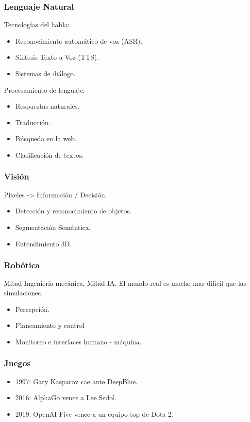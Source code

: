 \documentclass[10pt]{beamer}
\begin{document}
\begin{frame}
    \frametitle{Lenguaje Natural}
    Tecnologías del habla:
    \begin{itemize}
        \item Reconocimiento automático de voz (ASR).
        \item Síntesis Texto a Voz (TTS).
        \item Sistemas de diálogo.
    \end{itemize}
    Procesamiento de lenguaje:
    \begin{itemize}
        \item Respuestas naturales.
        \item Traducción.
        \item Búsqueda en la web.
        \item Clasificación de textos.
    \end{itemize}
    
\end{frame}

\begin{frame}
    \frametitle{Visión}
    Pixeles -> Información / Decisión.

    \begin{itemize}
        \item Detección y reconocimiento de objetos.
        \item Segmentación Semántica.
        \item Entendimiento 3D.
    \end{itemize}
\end{frame}

\begin{frame}
    \frametitle{Robótica}
    Mitad Ingeniería mecánica, Mitad IA. El mundo real es mucho mas difícil que las simulaciones.

    \begin{itemize}
        \item Percepción.
        \item Planeamiento y control
        \item Monitoreo e interfaces humano - máquina.
    \end{itemize}
\end{frame}

\begin{frame}
    \frametitle{Juegos}
    \begin{itemize}
        \item 1997: Gary Kasparov cae ante DeepBlue.
        \item 2016: AlphaGo vence a Lee Sedol.
        \item 2019: OpenAI Five vence a un equipo top de Dota 2.
    \end{itemize}
\end{frame}
\end{document}
